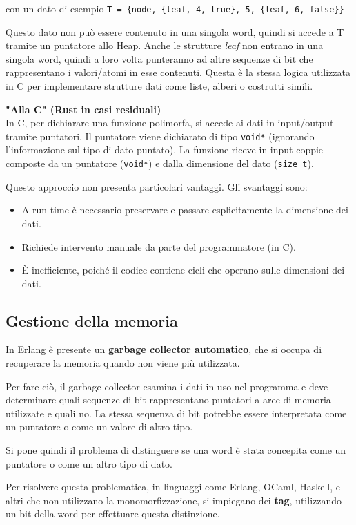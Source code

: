 \documentclass{article}
\begin{document}
con un dato di esempio \texttt{T = \{node, \{leaf, 4, true\}, 5, \{leaf, 6, false\}\}}

Questo dato non può essere contenuto in una singola word, quindi si accede a T tramite un puntatore allo Heap. Anche le strutture \textit{leaf} non entrano in una singola word, quindi a loro volta punteranno ad altre sequenze di bit che rappresentano i valori/atomi in esse contenuti. Questa è la stessa logica utilizzata in C per implementare strutture dati come liste, alberi o costrutti simili.\vspace{14pt}

\textbf{"Alla C" (Rust in casi residuali)}\\
In C, per dichiarare una funzione polimorfa, si accede ai dati in input/output tramite puntatori. Il puntatore viene dichiarato di tipo \texttt{void*} (ignorando l'informazione sul tipo di dato puntato). La funzione riceve in input coppie composte da un puntatore (\texttt{void*}) e dalla dimensione del dato (\texttt{size\_t}).

Questo approccio non presenta particolari vantaggi. Gli svantaggi sono:
\begin{itemize}
    \item A run-time è necessario preservare e passare esplicitamente la dimensione dei dati.
    \item Richiede intervento manuale da parte del programmatore (in C).
    \item È inefficiente, poiché il codice contiene cicli che operano sulle dimensioni dei dati.
\end{itemize}

\subsection*{Gestione della memoria}
In Erlang è presente un \textbf{garbage collector automatico}, che si occupa di recuperare la memoria quando non viene più utilizzata.

Per fare ciò, il garbage collector esamina i dati in uso nel programma e deve determinare quali sequenze di bit rappresentano puntatori a aree di memoria utilizzate e quali no. La stessa sequenza di bit potrebbe essere interpretata come un puntatore o come un valore di altro tipo.

Si pone quindi il problema di distinguere se una word è stata concepita come un puntatore o come un altro tipo di dato.

Per risolvere questa problematica, in linguaggi come Erlang, OCaml, Haskell, e altri che non utilizzano la monomorfizzazione, si impiegano dei \textbf{tag}, utilizzando un bit della word per effettuare questa distinzione.
\end{document}
